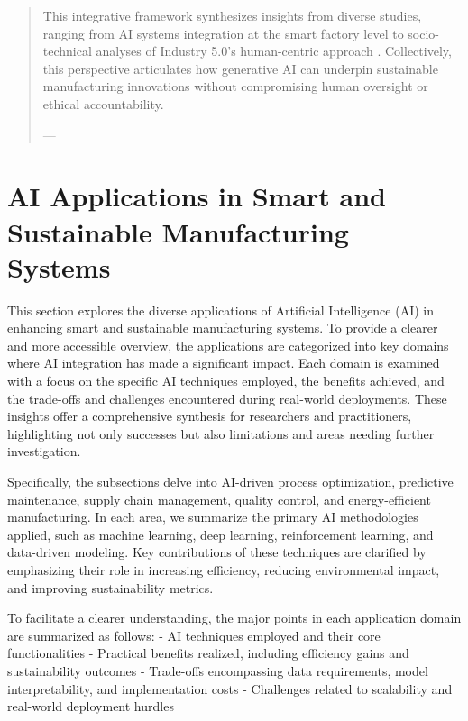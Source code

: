 \documentclass[sigconf]{acmart}
\begin{document}
\begin{abstract}
This integrative framework synthesizes insights from diverse studies, ranging from AI systems integration at the smart factory level \cite{ref11} to socio-technical analyses of Industry 5.0’s human-centric approach \cite{ref19}. Collectively, this perspective articulates how generative AI can underpin sustainable manufacturing innovations without compromising human oversight or ethical accountability.

---
\end{abstract}

\maketitle

\section{AI Applications in Smart and Sustainable Manufacturing Systems}

This section explores the diverse applications of Artificial Intelligence (AI) in enhancing smart and sustainable manufacturing systems. To provide a clearer and more accessible overview, the applications are categorized into key domains where AI integration has made a significant impact. Each domain is examined with a focus on the specific AI techniques employed, the benefits achieved, and the trade-offs and challenges encountered during real-world deployments. These insights offer a comprehensive synthesis for researchers and practitioners, highlighting not only successes but also limitations and areas needing further investigation.

Specifically, the subsections delve into AI-driven process optimization, predictive maintenance, supply chain management, quality control, and energy-efficient manufacturing. In each area, we summarize the primary AI methodologies applied, such as machine learning, deep learning, reinforcement learning, and data-driven modeling. Key contributions of these techniques are clarified by emphasizing their role in increasing efficiency, reducing environmental impact, and improving sustainability metrics.

To facilitate a clearer understanding, the major points in each application domain are summarized as follows:
- AI techniques employed and their core functionalities
- Practical benefits realized, including efficiency gains and sustainability outcomes
- Trade-offs encompassing data requirements, model interpretability, and implementation costs
- Challenges related to scalability and real-world deployment hurdles
\end{document}
